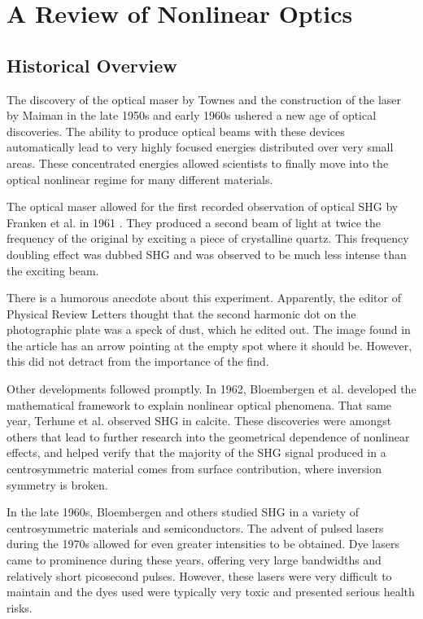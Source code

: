 \section{A Review of Nonlinear Optics}
\subsection{Historical Overview}\label{chap_theory_hist}
The discovery of the optical maser by Townes \cite{PhysRev.112.1940} and the construction of the laser by Maiman in the late 1950s and early 1960s ushered a new age of optical discoveries. The ability to produce optical beams with these devices automatically lead to very highly focused energies distributed over very small areas. These concentrated energies allowed scientists to finally move into the optical nonlinear regime for many different materials.

The optical maser allowed for the first recorded observation of optical SHG by Franken et al. in 1961 \cite{PhysRevLett.7.118}. They produced a second beam of light at twice the frequency of the original by exciting a piece of crystalline quartz. This frequency doubling effect was dubbed SHG and was observed to be much less intense than the exciting beam.

There is a humorous anecdote about this experiment. Apparently, the editor of Physical Review Letters thought that the second harmonic dot on the photographic plate was a speck of dust, which he edited out. The image found in the article has an arrow pointing at the empty spot where it should be. However, this did not detract from the importance of the find.

Other developments followed promptly. In 1962, Bloembergen et al. \cite{PhysRev.127.1918, PhysRev.128.606} developed the mathematical framework to explain nonlinear optical phenomena. That same year, Terhune et al. \cite{PhysRevLett.8.404} observed SHG in calcite. These discoveries were amongst others \cite{lax1962nonlinear} that lead to further research into the geometrical dependence of nonlinear effects, and helped verify that the majority of the SHG signal produced in a centrosymmetric material comes from surface contribution, where inversion symmetry is broken.

In the late 1960s, Bloembergen \cite{PhysRev.174.813} and others \cite{PhysRev.178.1218} studied SHG in a variety of centrosymmetric materials and semiconductors. The advent of pulsed lasers during the 1970s \cite{nla.cat-vn2583352} allowed for even greater intensities to be obtained. Dye lasers came to prominence during these years, offering very large bandwidths and relatively short picosecond pulses. However, these lasers were very difficult to maintain and the dyes used were typically very toxic and presented serious health risks.

